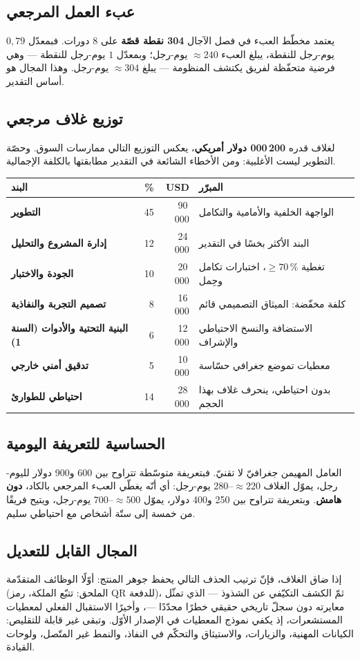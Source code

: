 \subsection{عبء العمل المرجعي}
يعتمد مخطّط العبء في فصل الآجال \textbf{304 نقطة قصّة} على 8 دورات. فبمعدّل
$0{,}79$ يوم-رجل للنقطة، يبلغ العبء $\approx 240$ يوم-رجل؛ وبمعدّل $1$ يوم-رجل
للنقطة --- وهي فرضية متحفّظة لفريق يكتشف المنظومة --- يبلغ $\approx 304$
يوم-رجل. وهذا المجال هو أساس التقدير.

\subsection{توزيع غلاف مرجعي}
لغلاف قدره \textbf{200\,000 دولار أمريكي}، يعكس التوزيع التالي ممارسات السوق.
وحصّة التطوير ليست الأغلبية: ومن الأخطاء الشائعة في التقدير مطابقتها بالكلفة
الإجمالية.

\begin{xltabular}{\textwidth}{>{\bfseries}p{5.2cm} r r X}
\toprule
\textbf{البند} & \textbf{\%} & \textbf{USD} & \textbf{المبرّر} \\
\midrule
\endhead
التطوير & 45 & 90\,000 & الواجهة الخلفية والأمامية والتكامل \\
إدارة المشروع والتحليل & 12 & 24\,000 & البند الأكثر بخسًا في التقدير \\
الجودة والاختبار & 10 & 20\,000 & تغطية $\geq 70\,\%$، اختبارات تكامل وحِمل \\
تصميم التجربة والنفاذية & 8 & 16\,000 & كلفة مخفّضة: الميثاق التصميمي قائم \\
البنية التحتية والأدوات (السنة 1) & 6 & 12\,000 & الاستضافة والنسخ الاحتياطي والإشراف \\
تدقيق أمني خارجي & 5 & 10\,000 & معطيات تموضع جغرافي حسّاسة \\
احتياطي للطوارئ & 14 & 28\,000 & بدون احتياطي، ينحرف غلاف بهذا الحجم \\
\bottomrule
\end{xltabular}

\subsection{الحساسية للتعريفة اليومية}
العامل المهيمن جغرافيّ لا تقنيّ. فبتعريفة متوسّطة تتراوح بين 600 و900 دولار
لليوم-رجل، يموّل الغلاف $\approx 220$--$280$ يوم-رجل: أي أنّه يغطّي العبء
المرجعي بالكاد، \textbf{دون هامش}. وبتعريفة تتراوح بين 250 و400 دولار، يموّل
$\approx 500$--$700$ يوم-رجل، ويتيح فريقًا من خمسة إلى ستّة أشخاص مع احتياطي
سليم.

\subsection{المجال القابل للتعديل}
إذا ضاق الغلاف، فإنّ ترتيب الحذف التالي يحفظ جوهر المنتج: أوّلًا الوظائف
المتقدّمة (الملحق: تتبّع الملكة، رمز QR للدفعة)، ثمّ الكشف التكيّفي عن الشذوذ
--- الذي تمثّل معايرته دون سجلّ تاريخي حقيقي خطرًا محدّدًا ---، وأخيرًا الاستقبال
الفعلي لمعطيات المستشعرات، إذ يكفي نموذج المعطيات في الإصدار الأوّل. وتبقى غير
قابلة للتقليص: الكيانات المهنية، والزيارات، والاستيثاق والتحكّم في النفاذ، والنمط
غير المتّصل، ولوحات القيادة.

